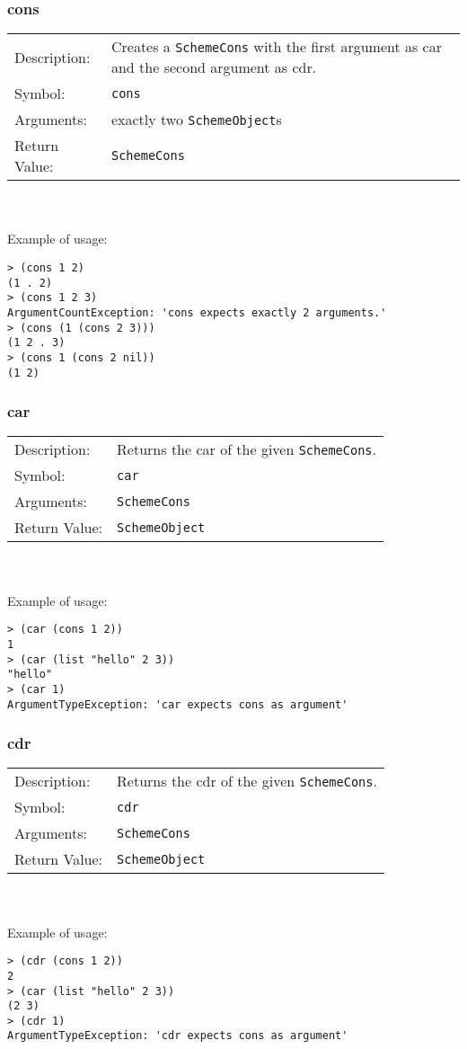 \documentclass[12pt,a4paper]{scrartcl}
\begin{document}
\subsubsection*{cons}
\begin{tabular}{l  p{13cm}}
Description: & Creates a \lstinline{SchemeCons} with the first argument as car and the second argument as cdr.\\
Symbol: & \lstinline{cons}\\
Arguments: & exactly two \lstinline{SchemeObject}s\\
Return Value: & \lstinline{SchemeCons}
\end{tabular}
\\
\\
Example of usage:
\begin{lstlisting}
> (cons 1 2)
(1 . 2)
> (cons 1 2 3)
ArgumentCountException: 'cons expects exactly 2 arguments.'  
> (cons (1 (cons 2 3)))
(1 2 . 3)
> (cons 1 (cons 2 nil))
(1 2)
\end{lstlisting}

\subsubsection*{car}
\begin{tabular}{l  p{13cm}}
Description: & Returns the car of the given \lstinline{SchemeCons}.\\
Symbol: & \lstinline{car}\\
Arguments: & \lstinline{SchemeCons}\\
Return Value: & \lstinline{SchemeObject}
\end{tabular}
\\
\\
Example of usage:
\begin{lstlisting}
> (car (cons 1 2))
1
> (car (list "hello" 2 3))
"hello"
> (car 1)
ArgumentTypeException: 'car expects cons as argument'   
\end{lstlisting}

\subsubsection*{cdr}
\begin{tabular}{l  p{13cm}}
Description: & Returns the cdr of the given \lstinline{SchemeCons}.\\
Symbol: & \lstinline{cdr}\\
Arguments: & \lstinline{SchemeCons}\\
Return Value: & \lstinline{SchemeObject}
\end{tabular}
\\
\\
Example of usage:
\begin{lstlisting}
> (cdr (cons 1 2))
2
> (car (list "hello" 2 3))
(2 3)
> (cdr 1)
ArgumentTypeException: 'cdr expects cons as argument'   
\end{lstlisting}
\end{document}
